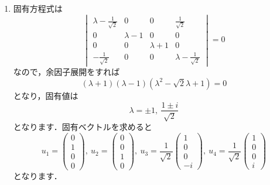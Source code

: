 \documentclass[a4paper,pdflatex,ja=standard]{bxjsarticle}
\begin{document}
\begin{enumerate}
\begin{enumerate}
    
    \item 

    固有方程式は
    \begin{equation}
      \begin{vmatrix}
        \lambda-\frac{1}{\sqrt{2}} & 0 & 0 & \frac{1}{\sqrt{2}} \\
        0 & \lambda-1 & 0 & 0 \\
        0 & 0 & \lambda+1 & 0 \\
        -\frac{1}{\sqrt{2}} & 0 & 0 & \lambda-\frac{1}{\sqrt{2}}
      \end{vmatrix}
      =
      0
    \end{equation}
    なので，余因子展開をすれば
    \begin{equation}
      (\lambda+1)(\lambda-1)(\lambda^2-\sqrt{2}\lambda+1)
      =
      0
    \end{equation}
    となり，固有値は
    \begin{equation}
      \lambda
      =
      \pm 1
      ,\ 
      \frac{1\pm i}{\sqrt{2}}
    \end{equation}
    となります．固有ベクトルを求めると
    \begin{equation}
      u_1
      =
      \begin{pmatrix}
        0 \\
        1 \\
        0 \\
        0
      \end{pmatrix}
      ,\ 
      u_2
      =
      \begin{pmatrix}
        0 \\
        0 \\
        1 \\
        0
      \end{pmatrix}
      ,\ 
      u_3
      =
      \frac{1}{\sqrt{2}}
      \begin{pmatrix}
        1 \\
        0 \\
        0 \\
        -i
      \end{pmatrix}
      ,\ 
      u_4
      =
      \frac{1}{\sqrt{2}}
      \begin{pmatrix}
        1 \\
        0 \\
        0 \\
        i
      \end{pmatrix}
    \end{equation}
    となります．



\end{enumerate}
\end{enumerate}
\end{document}
